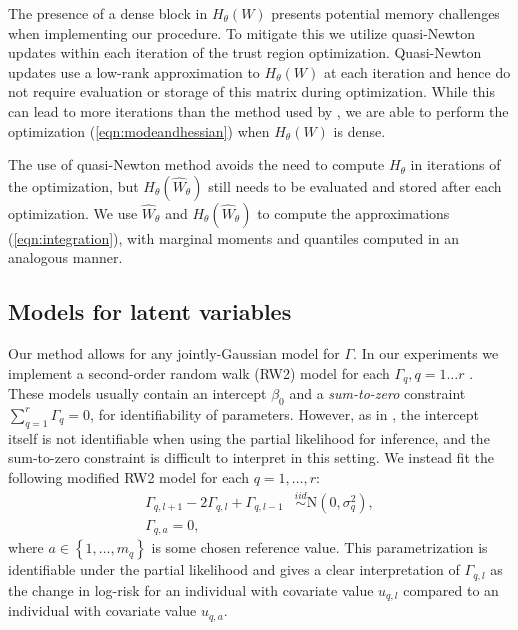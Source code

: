\documentclass[]{article}
\begin{document}
The presence of a dense block in $H_{\theta}(W)$ presents potential memory challenges when implementing our procedure. To mitigate this we utilize quasi-Newton updates within each iteration of the trust region optimization. Quasi-Newton updates use a low-rank approximation to $H_{\theta}(W)$ at each iteration and hence do not require evaluation or storage of this matrix during optimization. While this can lead to more iterations than the method used by \citet{casecross}, we are able to perform the optimization (\ref{eqn:modeandhessian}) when $H_{\theta}(W)$ is dense.

The use of quasi-Newton method avoids the need to compute $H_{\theta}$ in iterations of the optimization, but $H_{\theta}(\widehat{W}_{\theta})$ still needs to be evaluated and stored after each optimization. We use $\widehat{W}_{\theta}$ and $H_{\theta}(\widehat{W}_{\theta})$ to compute the approximations (\ref{eqn:integration}), with marginal moments and quantiles computed in an analogous manner. 


\subsection{Models for latent variables}\label{subsec:latent}

Our method allows for any jointly-Gaussian model for $\Gamma$. In our experiments we implement a second-order random walk (RW2) model for each $\Gamma_{q},q = 1\ldots r$ \citep{rw2}. These models usually contain an intercept $\beta_{0}$ and a \emph{sum-to-zero} constraint $\sum_{q=1}^{r}\Gamma_{q} = 0$, for identifiability of parameters. However, as in \citet{casecross}, the intercept itself is not identifiable when using the partial likelihood for inference, and the sum-to-zero constraint is difficult to interpret in this setting. We instead fit the following modified RW2 model for each $q = 1,\ldots,r$:
\begin{equation}\begin{aligned}\label{eqn:rw2}
\Gamma_{q,l+1} - 2\Gamma_{q,l} + \Gamma_{q,l-1} &\overset{iid}{\sim}\text{N}\left( 0,\sigma^{2}_{q}\right), \\
\Gamma_{q,a} = 0,
\end{aligned}\end{equation}
where $a\in\left\lbrace 1,\ldots,m_{q}\right\rbrace$ is some chosen reference value. This parametrization is identifiable under the partial likelihood and gives a clear interpretation of $\Gamma_{q,l}$ as the change in log-risk for an individual with covariate value $u_{q,l}$ compared to an individual with covariate value $u_{q,a}$. 
\end{document}
